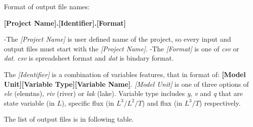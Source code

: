 \documentclass[]{scrbook}
\begin{document}
Format of output file names:

\textbf{{[}Project Name{]}.{[}Identifier{]}.{[}Format{]}}

-The \emph{{[}Project Name{]}} is user defined name of the project, so
every input and output files must start with the \emph{{[}Project
Name{]}}. -The \emph{{[}Format{]}} is one of \emph{csv} or \emph{dat}.
\emph{csv} is spreadsheet format and \emph{dat} is bindary format.

The \emph{{[}Identifier{]}} is a combination of variables features, that
in format of: \textbf{{[}Model Unit{]}{[}Variable Type{]}{[}Variable
Name{]}}. \emph{{[}Model Unit{]}} is one of three options of \emph{ele}
(elemtns), \emph{riv} (river) or \emph{lak} (lake). Variable type
includes \emph{y}, \emph{v} and \emph{q} that are state variable (in
\(L\)), specific flux (in \(L^3/L^2/T\)) and flux (in \(L^3/T\))
respectively.

The list of output files is in following table.
\end{document}
